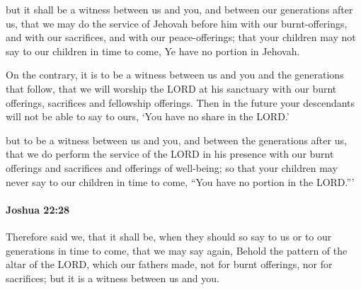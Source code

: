 			\begin{versebox}
					\item[BHS] 
					\item[ASV] but it shall be a witness between us and you, and between our generations after us, that we may do the service of Jehovah before him with our burnt-offerings, and with our sacrifices, and with our peace-offerings; that your children may not say to our children in time to come, Ye have no portion in Jehovah.
					\item[NIV] On the contrary, it is to be a witness between us and you and the generations that follow, that we will worship the LORD at his sanctuary with our burnt offerings, sacrifices and fellowship offerings. Then in the future your descendants will not be able to say to ours, ‘You have no share in the LORD.’
					\item[NRSV] but to be a witness between us and you, and between the generations after us, that we do perform the service of the LORD in his presence with our burnt offerings and sacrifices and offerings of well-being; so that your children may never say to our children in time to come, “You have no portion in the LORD.”’
			\end{versebox}

		\paragraph{Joshua 22:28} %
			\label{JOSHUA-22-28}

			Therefore said we, that it shall be, when they should so say to us or to our generations in time to come, that we may say again, Behold the pattern of the altar of the LORD, which our fathers made, not for burnt offerings, nor for sacrifices; but it is a witness between us and you.

